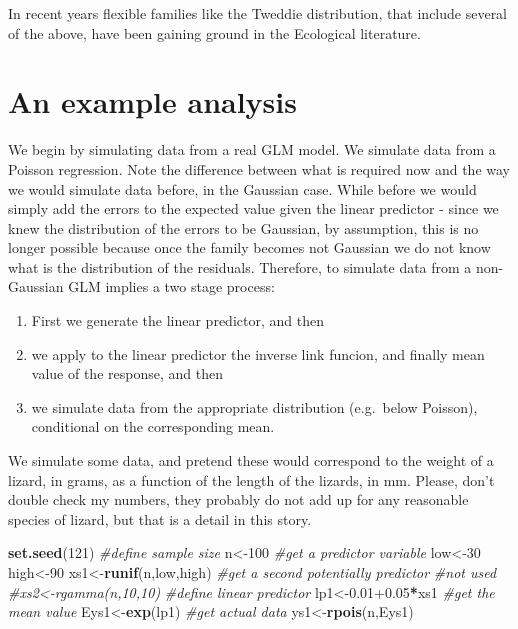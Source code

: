 \documentclass[
]{book}
\newenvironment{Shaded}{\begin{snugshade}}{\end{snugshade}}
\newcommand{\CommentTok}[1]{\textcolor[rgb]{0.56,0.35,0.01}{\textit{#1}}}
\newcommand{\DecValTok}[1]{\textcolor[rgb]{0.00,0.00,0.81}{#1}}
\newcommand{\FloatTok}[1]{\textcolor[rgb]{0.00,0.00,0.81}{#1}}
\newcommand{\KeywordTok}[1]{\textcolor[rgb]{0.13,0.29,0.53}{\textbf{#1}}}
\newcommand{\NormalTok}[1]{#1}
\newcommand{\OperatorTok}[1]{\textcolor[rgb]{0.81,0.36,0.00}{\textbf{#1}}}
\providecommand{\tightlist}{%
  \setlength{\itemsep}{0pt}\setlength{\parskip}{0pt}}
\begin{document}
In recent years flexible families like the Tweddie distribution, that include several of the above, have been gaining ground in the Ecological literature.

\hypertarget{an-example-analysis}{%
\section{An example analysis}\label{an-example-analysis}}

We begin by simulating data from a real GLM model. We simulate data from a Poisson regression. Note the difference between what is required now and the way we would simulate data before, in the Gaussian case. While before we would simply add the errors to the expected value given the linear predictor - since we knew the distribution of the errors to be Gaussian, by assumption, this is no longer possible because once the family becomes not Gaussian we do not know what is the distribution of the residuals. Therefore, to simulate data from a non-Gaussian GLM implies a two stage process:

\begin{enumerate}
\def\labelenumi{\arabic{enumi}.}
\tightlist
\item
  First we generate the linear predictor, and then
\item
  we apply to the linear predictor the inverse link funcion, and finally
  mean value of the response, and then
\item
  we simulate data from the appropriate distribution (e.g.~below Poisson), conditional on the corresponding mean.
\end{enumerate}

We simulate some data, and pretend these would correspond to the weight of a lizard, in grams, as a function of the length of the lizards, in mm. Please, don't double check my numbers, they probably do not add up for any reasonable species of lizard, but that is a detail in this story.

\begin{Shaded}
\begin{Highlighting}[]
\KeywordTok{set.seed}\NormalTok{(}\DecValTok{121}\NormalTok{)}
\CommentTok{#define sample size}
\NormalTok{n<-}\DecValTok{100}
\CommentTok{#get a predictor variable}
\NormalTok{low<-}\DecValTok{30}
\NormalTok{high<-}\DecValTok{90}
\NormalTok{xs1<-}\KeywordTok{runif}\NormalTok{(n,low,high)}
\CommentTok{#get a second potentially predictor}
\CommentTok{#not used}
\CommentTok{#xs2<-rgamma(n,10,10)}
\CommentTok{#define linear predictor}
\NormalTok{lp1<-}\FloatTok{0.01+0.05}\OperatorTok{*}\NormalTok{xs1}
\CommentTok{#get the mean value}
\NormalTok{Eys1<-}\KeywordTok{exp}\NormalTok{(lp1)}
\CommentTok{#get actual data}
\NormalTok{ys1<-}\KeywordTok{rpois}\NormalTok{(n,Eys1)}
\end{Highlighting}
\end{Shaded}
\end{document}

